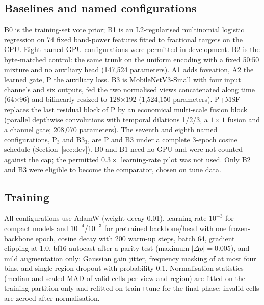 \documentclass[sigconf,anonymous]{acmart}
\begin{document}
\subsection{Baselines and named configurations}
\label{sec:configs}
B0 is the training-set vote prior; B1 is an L2-regularised multinomial logistic regression on 74 fixed band-power features fitted to fractional targets on the CPU. Eight named GPU configurations were permitted in development. B2 is the byte-matched control: the same trunk on the uniform encoding with a fixed 50:50 mixture and no auxiliary head (147,524 parameters). A1 adds foveation, A2 the learned gate, P the auxiliary loss. B3 is MobileNetV3-Small \cite{howard2019mobilenetv3,wightman2019timm} with four input channels and six outputs, fed the two normalised views concatenated along time (64$\times$96) and bilinearly resized to 128$\times$192 (1,524,150 parameters). P+MSF replaces the last residual block of P by an economical multi-scale fusion block (parallel depthwise convolutions with temporal dilations 1/2/3, a $1\times 1$ fusion and a channel gate; 208,070 parameters). The seventh and eighth named configurations, P$_3$ and B3$_3$, are P and B3 under a complete 3-epoch cosine schedule (Section~\ref{sec:dev}). B0 and B1 need no GPU and were not counted against the cap; the permitted $0.3\times$ learning-rate pilot was not used. Only B2 and B3 were eligible to become the comparator, chosen on tune data.

\subsection{Training}
All configurations use AdamW \cite{loshchilov2019adamw} (weight decay 0.01), learning rate $10^{-3}$ for compact models and $10^{-4}$/$10^{-3}$ for pretrained backbone/head with one frozen-backbone epoch, cosine decay with 200 warm-up steps, batch 64, gradient clipping at 1.0, bf16 autocast after a parity test (maximum $|\Delta p|=0.005$), and mild augmentation only: Gaussian gain jitter, frequency masking of at most four bins, and single-region dropout with probability 0.1. Normalisation statistics (median and scaled MAD of valid cells per view and region) are fitted on the training partition only and refitted on train+tune for the final phase; invalid cells are zeroed after normalisation.
\end{document}
